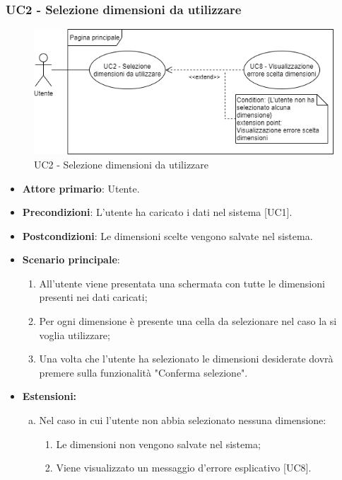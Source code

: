 \newpage
\subsubsection{UC2 - Selezione dimensioni da utilizzare}
\begin{figure}[h]
\includegraphics[width=\linewidth]{section/Images/UC2.png}
\centering
\caption{UC2 - Selezione dimensioni da utilizzare}
\end{figure}
\begin{itemize}
	\item \textbf{Attore primario}: Utente.
	\item \textbf{Precondizioni}: L'utente ha caricato i dati nel sistema [UC1].
	\item \textbf{Postcondizioni}: Le dimensioni scelte vengono salvate nel sistema.
	\item \textbf{Scenario principale}:
		\begin{enumerate}
			\item All'utente viene presentata una schermata con tutte le dimensioni presenti nei dati caricati;
			\item Per ogni dimensione è presente una cella da selezionare nel caso la si voglia utilizzare;
			\item Una volta che l'utente ha selezionato le dimensioni desiderate dovrà premere sulla funzionalità "Conferma selezione".
		\end{enumerate}
	\item \textbf{Estensioni:}
		\begin{enumerate}[(a)]
			\item Nel caso in cui l'utente non abbia selezionato nessuna dimensione:
			\begin{enumerate}[1.]
				\item Le dimensioni non vengono salvate nel sistema;
				\item Viene visualizzato un messaggio d'errore esplicativo [UC8].
			\end{enumerate}
		\end{enumerate}
\end{itemize}